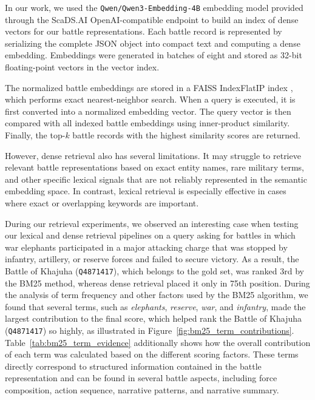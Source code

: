 In our work, we used the \texttt{Qwen/Qwen3-Embedding-4B} embedding model provided through the ScaDS.AI OpenAI-compatible endpoint to build an index of dense vectors for our battle representations. Each battle record is represented by serializing the complete JSON object into compact text and computing a dense embedding. Embeddings were generated in batches of eight and stored as 32-bit floating-point vectors in the vector index.

The normalized battle embeddings are stored in a FAISS IndexFlatIP index \citep{douze2024faiss}, which performs exact nearest-neighbor search. When a query is executed, it is first converted into a normalized embedding vector. The query vector is then compared with all indexed battle embeddings using inner-product similarity. Finally, the top-\(k\) battle records with the highest similarity scores are returned.

However, dense retrieval also has several limitations. It may struggle to retrieve relevant battle representations based on exact entity names, rare military terms, and other specific lexical signals that are not reliably represented in the semantic embedding space. In contrast, lexical retrieval is especially effective in cases where exact or overlapping keywords are important. 

During our retrieval experiments, we observed an interesting case when testing our lexical and dense retrieval pipelines on a query asking for battles in which war elephants participated in a major attacking charge that was stopped by infantry, artillery, or reserve forces and failed to secure victory. As a result, the Battle of Khajuha (\texttt{Q4871417}), which belongs to the gold set, was ranked 3rd by the BM25 method, whereas dense retrieval placed it only in 75th position. During the analysis of term frequency and other factors used by the BM25 algorithm, we found that several terms, such as \textit{elephants}, \textit{reserve}, \textit{war}, and \textit{infantry}, made the largest contribution to the final score, which helped rank the Battle of Khajuha (\texttt{Q4871417}) so highly, as illustrated in Figure~\ref{fig:bm25_term_contributions}. Table~\ref{tab:bm25_term_evidence} additionally shows how the overall contribution of each term was calculated based on the different scoring factors. These terms directly correspond to structured information contained in the battle representation and can be found in several battle aspects, including force composition, action sequence, narrative patterns, and narrative summary.

